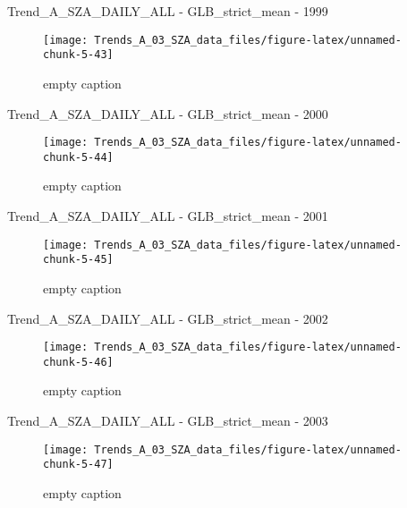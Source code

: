 \documentclass[
  10pt,
  a4paper,oneside]{article}
\begin{document}
Trend\_A\_SZA\_DAILY\_ALL - GLB\_strict\_mean - 1999

\begin{figure}[!ht]

{\centering \texttt{[image: Trends\_A\_03\_SZA\_data\_files/figure-latex/unnamed-chunk-5-43]} 

}

\caption{ empty caption }\label{fig:unnamed-chunk-5-43}
\end{figure}

Trend\_A\_SZA\_DAILY\_ALL - GLB\_strict\_mean - 2000

\begin{figure}[!ht]

{\centering \texttt{[image: Trends\_A\_03\_SZA\_data\_files/figure-latex/unnamed-chunk-5-44]} 

}

\caption{ empty caption }\label{fig:unnamed-chunk-5-44}
\end{figure}

Trend\_A\_SZA\_DAILY\_ALL - GLB\_strict\_mean - 2001

\begin{figure}[!ht]

{\centering \texttt{[image: Trends\_A\_03\_SZA\_data\_files/figure-latex/unnamed-chunk-5-45]} 

}

\caption{ empty caption }\label{fig:unnamed-chunk-5-45}
\end{figure}

Trend\_A\_SZA\_DAILY\_ALL - GLB\_strict\_mean - 2002

\begin{figure}[!ht]

{\centering \texttt{[image: Trends\_A\_03\_SZA\_data\_files/figure-latex/unnamed-chunk-5-46]} 

}

\caption{ empty caption }\label{fig:unnamed-chunk-5-46}
\end{figure}

Trend\_A\_SZA\_DAILY\_ALL - GLB\_strict\_mean - 2003

\begin{figure}[!ht]

{\centering \texttt{[image: Trends\_A\_03\_SZA\_data\_files/figure-latex/unnamed-chunk-5-47]} 

}

\caption{ empty caption }\label{fig:unnamed-chunk-5-47}
\end{figure}
\end{document}
